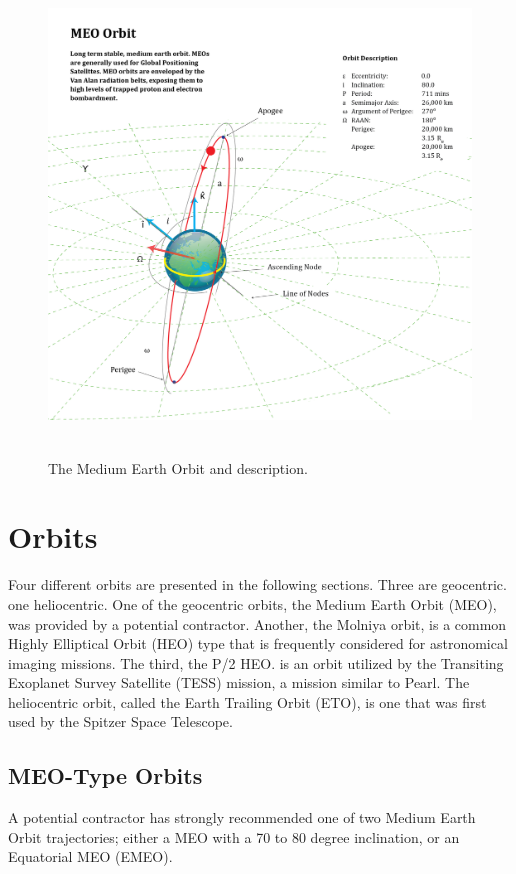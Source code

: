 \documentclass[11pt]{article}
\begin{document}
\begin{figure}[!b]
    \centering
    \includegraphics[height=5in]{OHB_MEO_Orbit.png}
    \caption{The Medium Earth Orbit and description.}
    \label{fig:OHBMEO}
\end{figure}

\section{Orbits}

Four different orbits are presented in the following sections. Three are geocentric. one heliocentric. One of the geocentric orbits, the Medium Earth Orbit (MEO), was provided by a potential contractor. Another, the Molniya orbit, is a common Highly Elliptical Orbit (HEO) type that is frequently considered for astronomical imaging missions. The third, the P/2 HEO. is an orbit utilized by the Transiting Exoplanet Survey Satellite (TESS) mission, a mission similar to Pearl. The heliocentric orbit, called the Earth Trailing Orbit (ETO), is one that was first used by the Spitzer Space Telescope.

\subsection{MEO-Type Orbits}

A potential contractor has strongly recommended one of two Medium Earth Orbit trajectories; either a MEO with a 70 to 80 degree inclination, or an Equatorial MEO (EMEO).
\end{document}

